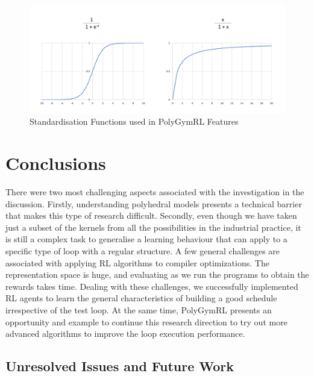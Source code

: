 \documentclass[logo,msc]{infthesis}           %
\begin{document}
\begin{figure}[htbp]
  \centering
  \includegraphics[width=\textwidth]{Images/Standardisation.png}    
  \caption{Standardisation Functions used in PolyGymRL Features}
  \label{fig:Standardisation}
\end{figure}


\chapter{Conclusions}

There were two most challenging aspects associated with the investigation in the discussion. Firstly, understanding polyhedral models presents a technical barrier that makes this type of research difficult. Secondly, even though we have taken just a subset of the kernels from all the possibilities in the industrial practice, it is still a complex task to generalise a learning behaviour that can apply to a specific type of loop with a regular structure. A few general challenges are associated with applying RL algorithms to compiler optimizations. The representation space is huge, and evaluating as we run the programs to obtain the rewards takes time. Dealing with these challenges, we successfully implemented RL agents to learn the general characteristics of building a good schedule irrespective of the test loop. At the same time, PolyGymRL presents an opportunity and example to continue this research direction to try out more advanced algorithms to improve the loop execution performance.

\section{Unresolved Issues and Future Work}
\end{document}
